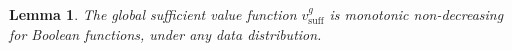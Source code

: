 \documentclass{article}
\newtheorem{lemma}{Lemma}
\begin{document}

\begin{lemma} \label{lem:bfd}
The global sufficient value function $v^g_{\text{suff}}$
is monotonic non-decreasing for Boolean functions,
under any data distribution.
\end{lemma}
\end{document}
